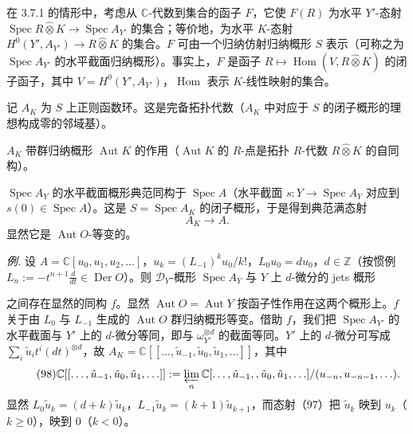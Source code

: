  在 3.7.1 的情形中，考虑从 $\mathbb{C}$-代数到集合的函子 $F$，它使 $F(R)$ 为水平 $Y'$-态射 $\operatorname{Spec} R\widehat{\otimes}K \to \operatorname{Spec} A_{Y'}$ 的集合；等价地，为水平 $K$-态射 $H^{0}(Y', A_{Y'}) \to R\widehat{\otimes}K$ 的集合。$F$ 可由一个归纳仿射归纳概形 $S$ 表示（可称之为 $\operatorname{Spec} A_{Y'}$ 的水平截面归纳概形）。事实上，$F$ 是函子 $R \mapsto \operatorname{Hom}(V, R\widehat{\otimes}K)$ 的闭子函子，其中 $V = H^{0}(Y', A_{Y'})$，$\operatorname{Hom}$ 表示 $K$-线性映射的集合。

记 $A_{K}$ 为 $S$ 上正则函数环。这是完备拓扑代数（$A_{K}$ 中对应于 $S$ 的闭子概形的理想构成零的邻域基）。

$A_{K}$ 带群归纳概形 $\operatorname{Aut} K$ 的作用（$\operatorname{Aut} K$ 的 $R$-点是拓扑 $R$-代数 $R\widehat{\otimes}K$ 的自同构）。

$\operatorname{Spec} A_{Y}$ 的水平截面概形典范同构于 $\operatorname{Spec} A$（水平截面 $s: Y \to \operatorname{Spec} A_{Y}$ 对应到 $s(0) \in \operatorname{Spec} A$）。这是 $S = \operatorname{Spec} A_{K}$ 的闭子概形，于是得到典范满态射
\begin{equation}\tag{97}
A_{K} \to A.
\end{equation}
显然它是 $\operatorname{Aut} O$-等变的。

\emph{例.} 设 $A = \mathbb{C}[u_{0}, u_{1}, u_{2}, \ldots]$，$u_{k} = (L_{-1})^{k}u_{0}/k!$，$L_{0}u_{0} = du_{0}$，$d \in \mathbb{Z}$（按惯例 $L_{n} := -t^{n+1}\frac{d}{dt} \in \operatorname{Der} O$）。则 $\mathcal{D}_{Y}$-概形 $\operatorname{Spec} A_{Y}$ 与 $Y$ 上 $d$-微分的 jets 概形

之间存在显然的同构 $f$。显然 $\operatorname{Aut} O = \operatorname{Aut} Y$ 按函子性作用在这两个概形上。$f$ 关于由 $L_{0}$ 与 $L_{-1}$ 生成的 $\operatorname{Aut} O$ 群归纳概形等变。借助 $f$，我们把 $\operatorname{Spec} A_{Y'}$ 的水平截面与 $Y'$ 上的 $d$-微分等同，即与 $\omega_{Y'}^{\otimes d}$ 的截面等同。$Y'$ 上的 $d$-微分可写成 $\sum_{i}\tilde{u}_{i}t^{i}(dt)^{\otimes d}$，故 $A_{K} = \mathbb{C}[[\ldots, \tilde{u}_{-1}, \tilde{u}_{0}, \tilde{u}_{1}, \ldots]]$，其中
\begin{equation}\tag{98}
\mathbb{C}[[\ldots, \tilde{u}_{-1}, \tilde{u}_{0}, \tilde{u}_{1}, \ldots]] := \varprojlim_{n}\mathbb{C}[\ldots, \tilde{u}_{-1},, \tilde{u}_{0}, \tilde{u}_{1}, \ldots]/(u_{-n}, u_{-n-1}, \ldots).
\end{equation}
显然 $L_{0}\tilde{u}_{k} = (d+k)\tilde{u}_{k}$，$L_{-1}\tilde{u}_{k} = (k+1)\tilde{u}_{k+1}$，而态射（97）把 $\tilde{u}_{k}$ 映到 $u_{k}$（$k \ge 0$），映到 $0$（$k < 0$）。

